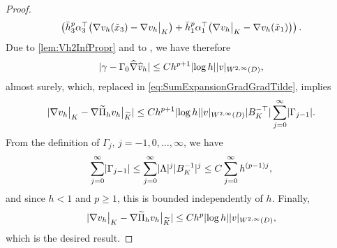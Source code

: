 \documentclass[10pt]{article}
\begin{document}
\begin{proof}
\begin{equation}
\begin{aligned}
\begin{pmatrix}
					   \bar h_3^p \alpha_3^\top \big(\nabla v_h(\tilde x_3) - \nabla v_h \bigr\rvert_{K}\big) + \bar h_1^p \alpha_1^\top \big(\nabla v_h \bigr\rvert_{K} - \nabla v_h(\tilde x_1)\big) \end{pmatrix}.                
\end{aligned}
\end{equation}	
Due to \cref{lem:Vh2InfPropr} and to , we have therefore
\begin{equation}
	\lvert\gamma - \Gamma_0 \widehat \nabla \widehat v_h\rvert \leq Ch^{p+1} \lvert\log h\rvert\lvert v\rvert_{W^{2, \infty}(D)},
\end{equation}
almost surely, which, replaced in \eqref{eq:SumExpansionGradGradTilde}, implies 
\begin{equation}
	\lvert\nabla v_h\bigr\rvert_{K} - \nabla \widetilde \Pi_h v_h \bigr\rvert_{\widetilde K}\rvert \leq Ch^{p+1}\lvert\log h\rvert\lvert v\rvert_{W^{2, \infty}(D)} \lvert B_K^{-\top}\rvert \sum_{j=0}^{\infty}\lvert\Gamma_{j-1}\rvert.
\end{equation}
From the definition of $\Gamma_j$, $j = -1, 0, \ldots, \infty$, we have
\begin{equation}
	\sum_{j=0}^{\infty} \lvert\Gamma_{j-1}\rvert \leq \sum_{j=0}^{\infty} \lvert\Lambda\rvert^j \lvert B_K^{-1}\rvert^j \leq C \sum_{j=0}^\infty h^{(p-1)j},
\end{equation}
and since $h < 1$ and $p \geq 1$, this is bounded independently of $h$. Finally,
\begin{equation}
	\lvert\nabla v_h\bigr\rvert_{K} - \nabla \widetilde \Pi_h v_h \bigr\rvert_{\widetilde K}\rvert \leq C h^p \lvert\log h\rvert \lvert v\rvert_{W^{2, \infty}(D)},
\end{equation}
which is the desired result.
\end{proof}
\end{document}
